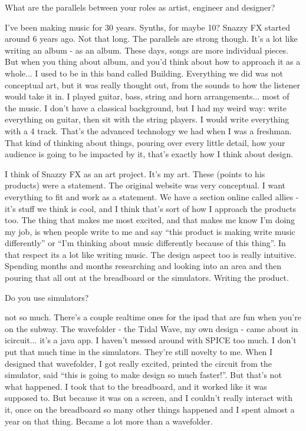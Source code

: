 What are the parallels between your roles as artist, engineer and designer? 

I've been making music for 30 years. Synths, for maybe 10? Snazzy FX started around 6 years ago. Not that long. The parallels are strong though. It's a lot like writing an album - as an album. These days, songs are more individual pieces. But when you thing about album, and you'd think about how to approach it as a whole... I used to be in this band called Building. Everything we did was not conceptual art, but it was really thought out, from the sounds to how the listener would take it in. I played guitar, bass, string and horn arrangements... most of the music. I don't have a classical background, but I had my weird way: write everything on guitar, then sit with the string players. I would write everything with a 4 track. That's the advanced technology we had when I was a freshman. That kind of thinking about things, pouring over every little detail, how your audience is going to be impacted by it, that's exactly how I think about design. 

I think of Snazzy FX as an art project. It's my art. These (points to his products) were a statement. The original website was very conceptual. I want everything to fit and work as a statement. We have a section online called allies - it's stuff we think is cool, and I think that's sort of how I approach the products too. The thing that makes me most excited, and that makes me know I'm doing my job, is when people write to me and say ``this product is making write music differently'' or ``I'm thinking about music differently because of this thing''. In that respect its a lot like writing music. The design aspect too is really intuitive. Spending months and months researching and looking into an area and then pouring that all out at the breadboard or the simulators. Writing the product. 

Do you use simulators? 

not so much. There's a couple realtime ones for the ipad that are fun when you're on the subway. The wavefolder - the Tidal Wave, my own design - came about in icircuit... it's a java app. I haven't messed around with SPICE too much. I don't put that much time in the simulators. They're still novelty to me. When I designed that wavefolder, I got really excited, printed the circuit from the simulator, said ``this is going to make design so much faster!''. But that's not what happened. I took that to the breadboard, and it worked like it was supposed to. But because it was on a screen, and I couldn't really interact with it, once on the breadboard so many other things happened and I spent almost a year on that thing. Became a lot more than a wavefolder. 

